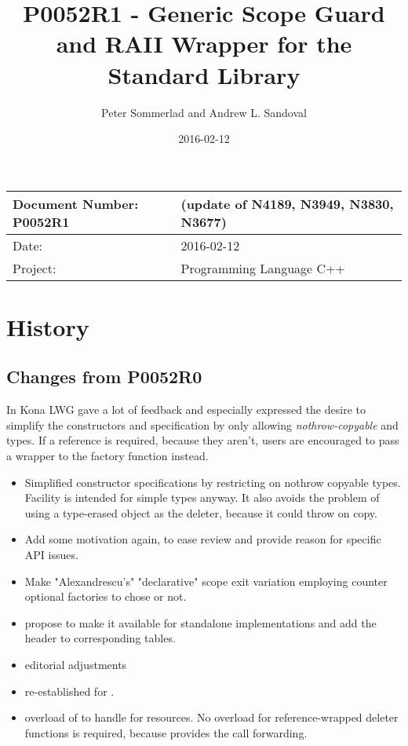 \documentclass[ebook,11pt,article]{memoir}
\title{P0052R1 - Generic Scope Guard and RAII Wrapper for the Standard Library}
\author{Peter Sommerlad and Andrew L. Sandoval}
\date{2016-02-12}                        %
\begin{document}
\maketitle
\begin{tabular}[t]{|l|l|}\hline 
Document Number: P0052R1 &   (update of N4189, N3949, N3830, N3677)\\\hline
Date: & 2016-02-12 \\\hline
Project: & Programming Language C++\\\hline 
\end{tabular}

\chapter{History}

\section{Changes from P0052R0}
In Kona LWG gave a lot of feedback and especially expressed the desire to simplify the constructors and specification by only allowing \emph{nothrow-copyable}  and  types. If a reference is required, because they aren't, users are encouraged to pass a  wrapper to the factory function instead.
\begin{itemize}
\item Simplified constructor specifications by restricting on nothrow copyable types. Facility is intended for simple types anyway. It also avoids the problem of using a type-erased  object as the deleter, because it could throw on copy.
\item Add some motivation again, to ease review and provide reason for specific API issues.
\item Make "Alexandrescu's" "declarative" scope exit variation employing  counter optional factories to chose or not.
\item propose to make it available for standalone implementations and add the header  to corresponding tables.
\item editorial adjustments
\item re-established  for .
\item overload of  to handle  for resources. No overload for reference-wrapped deleter functions is required, because  provides the call forwarding.
\end{itemize}
\end{document}
